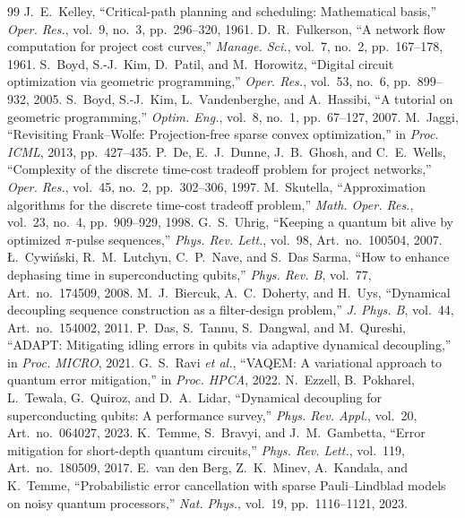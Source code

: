 \documentclass[10pt,journal]{IEEEtran}
\theoremstyle{remark}
\begin{document}

\begin{thebibliography}{99}
 J.~E.~Kelley, ``Critical-path planning and scheduling: Mathematical basis,'' \emph{Oper. Res.}, vol.~9, no.~3, pp.~296--320, 1961.
 D.~R.~Fulkerson, ``A network flow computation for project cost curves,'' \emph{Manage. Sci.}, vol.~7, no.~2, pp.~167--178, 1961.
 S.~Boyd, S.-J.~Kim, D.~Patil, and M.~Horowitz, ``Digital circuit optimization via geometric programming,'' \emph{Oper. Res.}, vol.~53, no.~6, pp.~899--932, 2005.
 S.~Boyd, S.-J.~Kim, L.~Vandenberghe, and A.~Hassibi, ``A tutorial on geometric programming,'' \emph{Optim. Eng.}, vol.~8, no.~1, pp.~67--127, 2007.
 M.~Jaggi, ``Revisiting Frank--Wolfe: Projection-free sparse convex optimization,'' in \emph{Proc. ICML}, 2013, pp.~427--435.
 P.~De, E.~J.~Dunne, J.~B.~Ghosh, and C.~E.~Wells, ``Complexity of the discrete time-cost tradeoff problem for project networks,'' \emph{Oper. Res.}, vol.~45, no.~2, pp.~302--306, 1997.
 M.~Skutella, ``Approximation algorithms for the discrete time-cost tradeoff problem,'' \emph{Math. Oper. Res.}, vol.~23, no.~4, pp.~909--929, 1998.
 G.~S.~Uhrig, ``Keeping a quantum bit alive by optimized $\pi$-pulse sequences,'' \emph{Phys. Rev. Lett.}, vol.~98, Art.~no.~100504, 2007.
 {\L}.~Cywi\'nski, R.~M.~Lutchyn, C.~P.~Nave, and S.~Das Sarma, ``How to enhance dephasing time in superconducting qubits,'' \emph{Phys. Rev. B}, vol.~77, Art.~no.~174509, 2008.
 M.~J.~Biercuk, A.~C.~Doherty, and H.~Uys, ``Dynamical decoupling sequence construction as a filter-design problem,'' \emph{J. Phys. B}, vol.~44, Art.~no.~154002, 2011.
 P.~Das, S.~Tannu, S.~Dangwal, and M.~Qureshi, ``ADAPT: Mitigating idling errors in qubits via adaptive dynamical decoupling,'' in \emph{Proc. MICRO}, 2021.
 G.~S.~Ravi \emph{et al.}, ``VAQEM: A variational approach to quantum error mitigation,'' in \emph{Proc. HPCA}, 2022.
 N.~Ezzell, B.~Pokharel, L.~Tewala, G.~Quiroz, and D.~A.~Lidar, ``Dynamical decoupling for superconducting qubits: A performance survey,'' \emph{Phys. Rev. Appl.}, vol.~20, Art.~no.~064027, 2023.
 K.~Temme, S.~Bravyi, and J.~M.~Gambetta, ``Error mitigation for short-depth quantum circuits,'' \emph{Phys. Rev. Lett.}, vol.~119, Art.~no.~180509, 2017.
 E.~van den Berg, Z.~K.~Minev, A.~Kandala, and K.~Temme, ``Probabilistic error cancellation with sparse Pauli--Lindblad models on noisy quantum processors,'' \emph{Nat. Phys.}, vol.~19, pp.~1116--1121, 2023.

\end{thebibliography}
\end{document}
